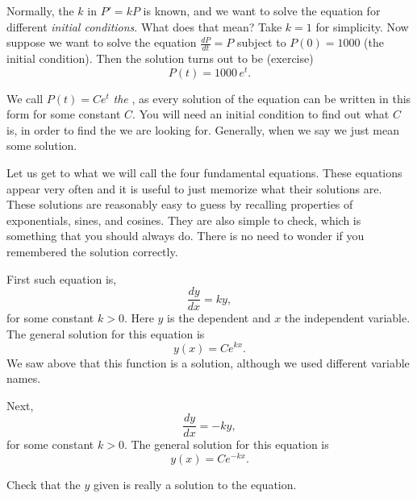 Normally, the $k$ in $P' = kP$ is known,
and we want to solve
the equation for different \emph{initial conditions}.
What does that mean?
Take $k=1$ for simplicity.  Now suppose we want to solve the equation
$\frac{dP}{dt} = P$ 
subject to $P(0) = 1000$ (the initial condition).
Then the solution turns out to be (exercise)
\begin{equation*}
P(t) = 1000 \, e^t .
\end{equation*}

We call $P(t) = C e^t$ \emph{the },
as every solution
of the equation can be written in this form for some constant $C$.  You
will need an initial condition to find out what $C$ is, in order to find the
\emph{} we are looking for.  Generally, when we say
 we just mean some solution.

\medskip

Let us get to what we will call the four fundamental equations.
These equations appear very often and it is useful to just memorize what
their solutions are.
These solutions
are reasonably easy
to guess by recalling properties of exponentials, sines, and cosines.
They are also simple to check, which is something that you should always do.
There is no need to wonder if you remembered the solution correctly.

\medskip

First such equation is,
\begin{equation*}
\frac{dy}{dx} = k y ,
\end{equation*}
for some constant $k > 0$.
Here $y$ is the dependent and $x$ the independent variable.
The general solution for this equation is
\begin{equation*}
y(x) = C e^{kx} .
\end{equation*}
We saw above that this function is a solution, although we used different
variable names.

\medskip

Next,
\begin{equation*}
\frac{dy}{dx} = -k y ,
\end{equation*}
for some constant $k > 0$.
The general solution for this equation is
\begin{equation*}
y(x) = C e^{-kx} .
\end{equation*}

\begin{exercise}
Check that the $y$ given is really a solution to the equation.
\end{exercise}

